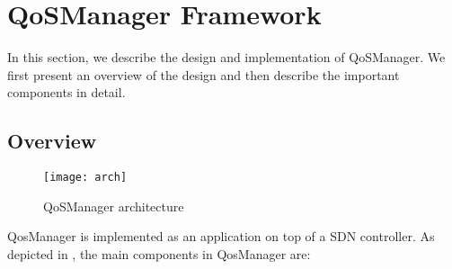 \section{QoSManager Framework}
\label{sect:qosmanager}
In this section, we describe the design and implementation of QoSManager. We first present
an overview of the design and then describe the important components in detail.

\subsection{Overview}

\begin{figure}[htb]
\centering
\texttt{[image: arch]}
\caption{QoSManager architecture}
\label{fig:architecture}
\end{figure}

QosManager is implemented as an application on top of a SDN controller. As depicted in ,
the main components in QosManager are: 


